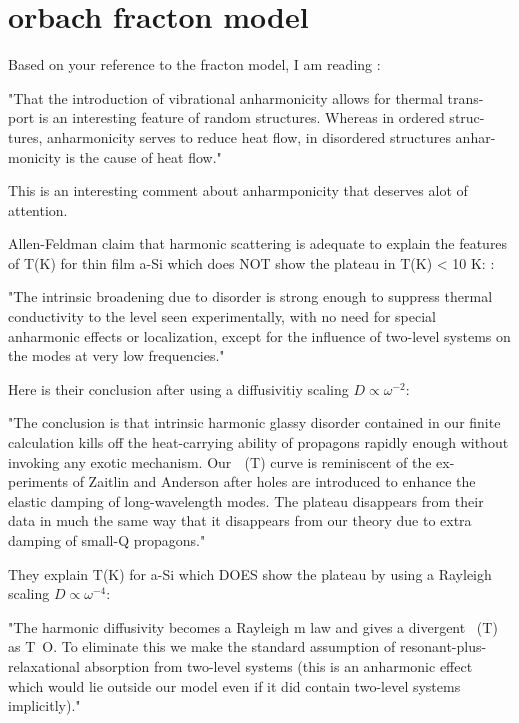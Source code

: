 \documentclass{article}
\begin{document}
\section{orbach fracton model}

Based on your reference to the fracton model, 
I am reading \cite{orbach_phonon_1993}:

"That the introduction of vibrational
anharmonicity allows for thermal trans-
port is an interesting feature of random
structures. Whereas in ordered struc-
tures, anharmonicity serves to reduce
heat flow, in disordered structures anhar-
monicity is the cause of heat flow."

This is an interesting comment about anharmponicity that deserves 
alot of attention. 

Allen-Feldman claim that harmonic scattering is adequate to explain the 
features of T(K) for thin film a-Si which does NOT show the plateau in 
T(K) < 10 K:
\cite{feldman_numerical_1999}:

"The intrinsic broadening due to disorder is strong enough to suppress
thermal conductivity to the level seen experimentally, with no need for 
special anharmonic effects or localization, except for the influence of 
two-level systems on the modes at very low frequencies."

Here is their conclusion after using a diffusivitiy scaling 
$D \propto \omega^{-2}$:

"The conclusion is that intrinsic harmonic glassy disorder
contained in our finite calculation kills off the heat-carrying
ability of propagons rapidly enough without invoking any
exotic mechanism. Our ␬ (T) curve is reminiscent of the ex-
periments of Zaitlin and Anderson after holes are introduced
to enhance the elastic damping of long-wavelength modes.
The plateau disappears from their data in much the same way
that it disappears from our theory due to extra damping of
small-Q propagons."

They explain T(K) for a-Si which DOES show the plateau by using a 
Rayleigh scaling $D \propto \omega^{-4}$:\cite{feldman_thermal_1993}

"The harmonic diffusivity becomes a Rayleigh m
law
and gives a divergent ~(T) as T~O. To eliminate this we make the standard 
assumption of resonant-plus-relaxational absorption from two-level systems 
(this is an anharmonic effect which would lie outside
our model even if it did contain two-level systems implicitly)."
\end{document}
